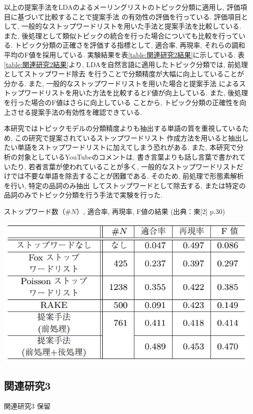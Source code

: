 \documentclass{ltjarticle}
\begin{document}
以上の提案手法をLDAのよるメーリングリストのトピック分類に適用し, 評価項目に基づいて比較することで提案手法
の有効性の評価を行っている. 評価項目として, 一般的なストップワードリストを用いた手法と提案手法を比較している. 
また, 後処理として類似トピックの統合を行った場合についても比較を行っている. 
トピック分類の正確さを評価する指標として, 適合率, 再現率, それらの調和平均のF値を採用している. 
実験結果を表\ref{table:関連研究2結果}に示している. 表\ref{table:関連研究2結果}より, LDAを自然言語に適用したトピック分類では, 前処理としてストップワード除去
を行うことで分類精度が大幅に向上していることが分かる. また, 一般的なストップワードリストを用いた場合と提案手法
によるストップワードリストを用いた方法を比較するとF値が向上している. また, 後処理を行った場合のF値はさらに向上している
ことから, トピック分類の正確性を向上させる提案手法の有効性を確認できている. 

本研究ではトピックモデルの分類精度よりも抽出する単語の質を重視しているため, この研究で提案されているストップワードリスト
作成方法を用いると抽出したい単語をストップワードリストに加えてしまう恐れがある. 
また, 本研究で分析の対象としているYouTubeのコメントは, 書き言葉よりも話し言葉で書かれていたり, 若者言葉が使われていることが多く, 
一般的なストップワードリストだけでは不要な単語を除去することが困難である. そのため, 前処理で形態素解析を行い, 特定の品詞のみ抽出
してストップワードとして除去する, または特定の品詞のみでトピック分類を行う手法で実験を行った. 
\begin{table}
    \centering
    \caption{ストップワード数（$\#N$）, 適合率, 再現率, F値の結果 (出典：東[2] p.30)}
    \vspace{5truept}
    \includegraphics[]{images/table2.png}
    \label{table:関連研究2結果}
\end{table}

\subsection{関連研究3}
関連研究3 保留
\end{document}
